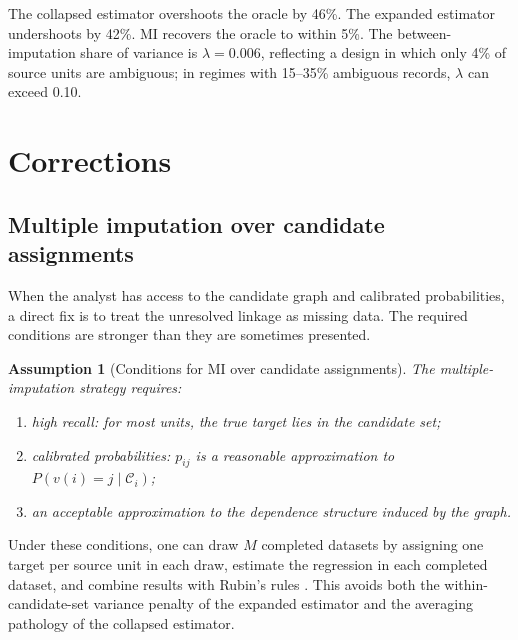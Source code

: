 \documentclass[12pt]{article}
\newtheorem{assumption}{Assumption}
\theoremstyle{remark}
\begin{document}
\begin{table}[ht]
\centering
\caption{Estimator comparison, medium-scale simulation ($K=40$, $n=600$).}
\label{tab:estimators}

\end{table}

\begin{table}[ht]
\centering
\caption{MI diagnostics via Rubin's rules ($M=200$ draws).}
\label{tab:mi_diag}

\end{table}

The collapsed estimator overshoots the oracle by 46\%. The expanded estimator undershoots by 42\%. MI recovers the oracle to within 5\%. The between-imputation share of variance is $\lambda = 0.006$, reflecting a design in which only 4\% of source units are ambiguous; in regimes with 15--35\% ambiguous records, $\lambda$ can exceed 0.10.

\section{Corrections}

\subsection{Multiple imputation over candidate assignments}

When the analyst has access to the candidate graph and calibrated probabilities, a direct fix is to treat the unresolved linkage as missing data. The required conditions are stronger than they are sometimes presented.

\begin{assumption}[Conditions for MI over candidate assignments]
The multiple-imputation strategy requires:
\begin{enumerate}
\item high recall: for most units, the true target lies in the candidate set;
\item calibrated probabilities: $p_{ij}$ is a reasonable approximation to $P(v(i)=j\mid \mathcal C_i)$;
\item an acceptable approximation to the dependence structure induced by the graph.
\end{enumerate}
\end{assumption}

Under these conditions, one can draw $M$ completed datasets by assigning one target per source unit in each draw, estimate the regression in each completed dataset, and combine results with Rubin's rules \citep{rubin1987}. This avoids both the within-candidate-set variance penalty of the expanded estimator and the averaging pathology of the collapsed estimator.
\end{document}
